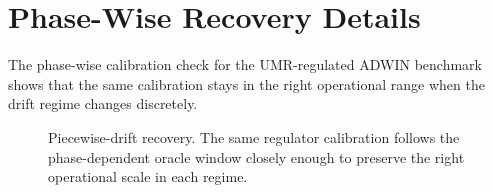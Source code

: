 \section{Phase-Wise Recovery Details}\label{app:piecewise_recovery}

The phase-wise calibration check for the UMR-regulated ADWIN benchmark shows
that the same calibration stays in the right operational range when the drift
regime changes discretely.



\begin{figure}[!htbp]
\centering
{}
\caption{Piecewise-drift recovery. The same regulator calibration follows the
phase-dependent oracle window closely enough to preserve the right operational
scale in each regime.}
\label{fig:cuberoot_adwin_piecewise}
\end{figure}
